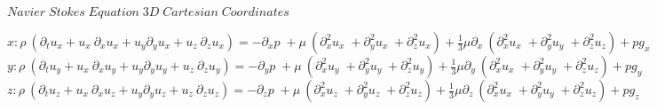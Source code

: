 \Large{$Navier\;Stokes\;Equation\;3D\;Cartesian\;Coordinates$}
\begin{center}
    \bigskip\LARGE{$x: \rho \: (\partial_t u_x + u_x \: \partial_x u_x + u_y \partial_y u_x + u_z \: \partial_z u_x) = -\partial_x p \; + \mu \: (\partial_x^2 u_x \; + \partial_y^2 u_x \; + \partial_z^2 u_x) + \frac{1}{3} \mu \partial_x \: (\partial_x^2 u_x \; + \partial_y^2 u_y \; + \partial_z^2 u_z) + pg_x$}\\
    \bigskip\LARGE{$y: \rho \: (\partial_t u_y + u_x \: \partial_x u_y + u_y \partial_y u_y + u_z \: \partial_z u_y) = -\partial_y p \; + \mu \: (\partial_x^2 u_y \; + \partial_y^2 u_y \; + \partial_z^2 u_y) + \frac{1}{3} \mu \partial_y \: (\partial_x^2 u_x \; + \partial_y^2 u_y \; + \partial_z^2 u_z) + pg_y$}\\
    \bigskip\LARGE{$z: \rho \: (\partial_t u_z + u_x \: \partial_x u_z + u_y \partial_y u_z + u_z \: \partial_z u_z) = -\partial_z p \; + \mu \: (\partial_x^2 u_z \; + \partial_y^2 u_z \; + \partial_z^2 u_z) + \frac{1}{3} \mu \partial_z \: (\partial_x^2 u_x \; + \partial_y^2 u_y \; + \partial_z^2 u_z) + pg_z$\\}

\end{center}
